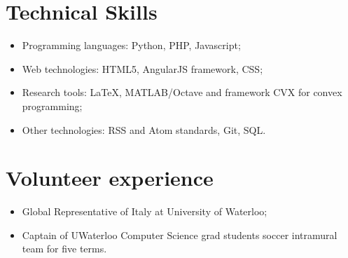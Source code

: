 \documentclass[]{article}
\begin{document}
\section{Technical Skills}\label{technical-skills}

\begin{itemize}
\itemsep1pt\parskip0pt
\item
  Programming languages: Python, PHP, Javascript;
\item
  Web technologies: HTML5, AngularJS framework, CSS;
\item
  Research tools: LaTeX, MATLAB/Octave and framework CVX for convex
  programming;
\item
  Other technologies: RSS and Atom standards, Git, SQL.
\end{itemize}

\section{Volunteer experience}\label{volunteer-experience}

\begin{itemize}
\itemsep1pt\parskip0pt
\item
  Global Representative of Italy at University of Waterloo;
\item
  Captain of UWaterloo Computer Science grad students soccer intramural
  team for five terms.
\end{itemize}
\end{document}
